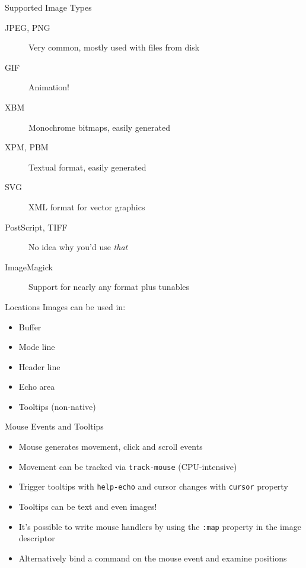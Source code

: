 \documentclass[presentation]{beamer}
\begin{document}
\begin{frame}[label=sec-2-5]{Supported Image Types}
\begin{description}
\item[{JPEG, PNG}] Very common, mostly used with files from disk
\item[{GIF}] Animation!
\item[{XBM}] Monochrome bitmaps, easily generated
\item[{XPM, PBM}] Textual format, easily generated
\item[{SVG}] XML format for vector graphics
\item[{PostScript, TIFF}] No idea why you'd use \emph{that}
\item[{ImageMagick}] Support for nearly any format plus tunables
\end{description}
\end{frame}

\begin{frame}[label=sec-2-6]{Locations}
Images can be used in:
\begin{itemize}
\item Buffer
\item Mode line
\item Header line
\item Echo area
\item Tooltips (non-native)
\end{itemize}
\end{frame}

\begin{frame}[fragile,label=sec-2-7]{Mouse Events and Tooltips}
 \begin{itemize}
\item Mouse generates movement, click and scroll events
\item Movement can be tracked via \texttt{track-mouse} (CPU-intensive)
\item Trigger tooltips with \texttt{help-echo} and cursor changes with \texttt{cursor}
  property
\item Tooltips can be text and even images!
\item It's possible to write mouse handlers by using the \texttt{:map} property
in the image descriptor
\item Alternatively bind a command on the mouse event and examine
positions
\end{itemize}
\end{frame}
\end{document}
